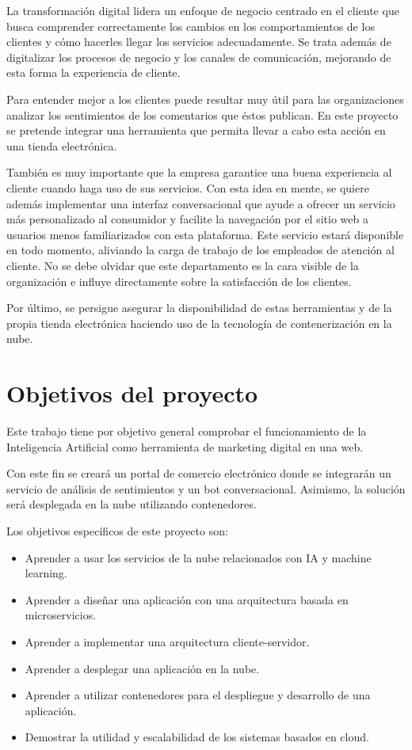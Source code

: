 La transformación digital lidera un enfoque de negocio centrado en el cliente que busca comprender correctamente los cambios en los comportamientos de los clientes y cómo hacerles llegar los servicios adecuadamente. Se trata además de digitalizar los procesos de negocio y los canales de comunicación, mejorando de esta forma la experiencia de cliente. 

Para entender mejor a los clientes puede resultar muy útil para las organizaciones analizar los sentimientos de los comentarios que éstos publican. En este proyecto se pretende integrar una herramienta que permita llevar a cabo esta acción en una tienda electrónica.

También es muy importante que la empresa garantice una buena experiencia al cliente cuando haga uso de sus servicios. Con esta idea en mente, se quiere además implementar una interfaz conversacional que ayude a ofrecer un servicio más personalizado al consumidor y facilite la navegación por el sitio web a usuarios menos familiarizados con esta plataforma. Este servicio estará disponible en todo momento, aliviando la carga de trabajo de los empleados de atención al cliente. No se debe olvidar que este departamento es la cara visible de la organización e influye directamente sobre la satisfacción de los clientes.

Por último, se persigue asegurar la disponibilidad de estas herramientas y de la propia tienda electrónica haciendo uso de la tecnología de contenerización en la nube.

\section {Objetivos del proyecto}

Este trabajo tiene por objetivo general comprobar el funcionamiento de la Inteligencia Artificial como herramienta de marketing digital en una web. 

Con este fin se creará un portal de comercio electrónico donde se integrarán un servicio de análisis de sentimientos y un bot conversacional. Asimismo, la solución será desplegada en la nube utilizando contenedores.

Los objetivos específicos de este proyecto son:
\begin{itemize}
    \item Aprender a usar los servicios de la nube relacionados con IA y machine learning.
    \item Aprender a diseñar una aplicación con una arquitectura basada en microservicios. 
    \item Aprender a implementar una arquitectura cliente-servidor.
    \item Aprender a desplegar una aplicación en la nube. 
    \item Aprender a utilizar contenedores para el despliegue y desarrollo de una aplicación.
    \item Demostrar la utilidad y escalabilidad de los sistemas basados en cloud.
\end{itemize}

